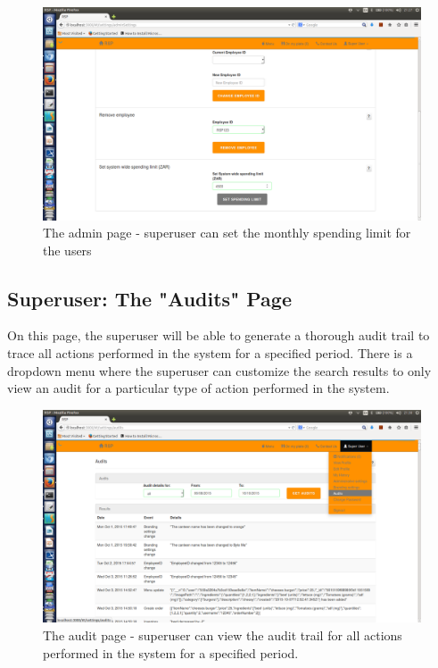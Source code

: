\documentclass[a4paper,12pt]{report}
\begin{document}
\begin{figure}[H]
  \centering
    \includegraphics[width=1.0\textwidth]{screenshots/setLimit.png}
    \caption{The admin page - superuser can set the monthly spending limit for the users} 
\end{figure}
\subsection{Superuser: The "Audits" Page} 
On this page, the superuser will be able to generate a thorough audit trail to trace all actions performed in the system for a specified period. There is a dropdown menu where the superuser can customize the search results to only view an audit for a particular type of action performed in the system.
\begin{figure}[H]
  \centering
    \includegraphics[width=1.0\textwidth]{screenshots/auditsAll.png}
    \caption{The audit page - superuser can view the audit trail for all actions performed in the system for a specified period. } 
\end{figure}
\end{document}
